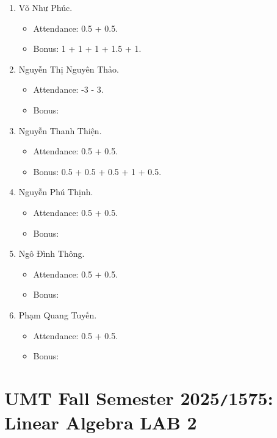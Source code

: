 \documentclass{article}
\begin{document}
\begin{enumerate}
\begin{itemize}
    \end{itemize}
    \item {\sc Võ Như Phúc.}
    \begin{itemize}
        \item Attendance: 0.5 + 0.5.
        \item Bonus: 1 + 1 + 1 + 1.5 + 1.
    \end{itemize}
    \item {\sc Nguyễn Thị Nguyên Thảo.}
    \begin{itemize}
        \item Attendance: -3 - 3.
        \item Bonus:
    \end{itemize}
    \item {\sc Nguyễn Thanh Thiện.}
    \begin{itemize}
        \item Attendance: 0.5 + 0.5.
        \item Bonus: 0.5 + 0.5 + 0.5 + 1 + 0.5.
    \end{itemize}
    \item {\sc Nguyễn Phú Thịnh.}
    \begin{itemize}
        \item Attendance: 0.5 + 0.5.
        \item Bonus:
    \end{itemize}
    \item {\sc Ngô Đình Thông.}
    \begin{itemize}
        \item Attendance: 0.5 + 0.5.
        \item Bonus:
    \end{itemize}
    \item {\sc Phạm Quang Tuyến.}
    \begin{itemize}
        \item Attendance: 0.5 + 0.5.
        \item Bonus:
    \end{itemize}
\end{enumerate}


\section{UMT Fall Semester 2025{\tt/}1575: Linear Algebra LAB 2}
\end{document}
